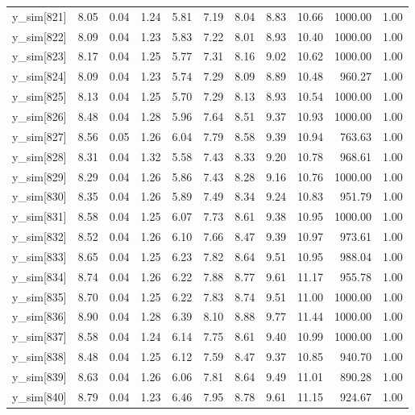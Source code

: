 \begin{table}[ht]
\begin{tabular}{rrrrrrrrrrr}
  y\_sim[821] & 8.05 & 0.04 & 1.24 & 5.81 & 7.19 & 8.04 & 8.83 & 10.66 & 1000.00 & 1.00 \\ 
  y\_sim[822] & 8.09 & 0.04 & 1.23 & 5.83 & 7.22 & 8.01 & 8.93 & 10.40 & 1000.00 & 1.00 \\ 
  y\_sim[823] & 8.17 & 0.04 & 1.25 & 5.77 & 7.31 & 8.16 & 9.02 & 10.62 & 1000.00 & 1.00 \\ 
  y\_sim[824] & 8.09 & 0.04 & 1.23 & 5.74 & 7.29 & 8.09 & 8.89 & 10.48 & 960.27 & 1.00 \\ 
  y\_sim[825] & 8.13 & 0.04 & 1.25 & 5.70 & 7.29 & 8.13 & 8.93 & 10.54 & 1000.00 & 1.00 \\ 
  y\_sim[826] & 8.48 & 0.04 & 1.28 & 5.96 & 7.64 & 8.51 & 9.37 & 10.93 & 1000.00 & 1.00 \\ 
  y\_sim[827] & 8.56 & 0.05 & 1.26 & 6.04 & 7.79 & 8.58 & 9.39 & 10.94 & 763.63 & 1.00 \\ 
  y\_sim[828] & 8.31 & 0.04 & 1.32 & 5.58 & 7.43 & 8.33 & 9.20 & 10.78 & 968.61 & 1.00 \\ 
  y\_sim[829] & 8.29 & 0.04 & 1.26 & 5.86 & 7.43 & 8.28 & 9.16 & 10.76 & 1000.00 & 1.00 \\ 
  y\_sim[830] & 8.35 & 0.04 & 1.26 & 5.89 & 7.49 & 8.34 & 9.24 & 10.83 & 951.79 & 1.00 \\ 
  y\_sim[831] & 8.58 & 0.04 & 1.25 & 6.07 & 7.73 & 8.61 & 9.38 & 10.95 & 1000.00 & 1.00 \\ 
  y\_sim[832] & 8.52 & 0.04 & 1.26 & 6.10 & 7.66 & 8.47 & 9.39 & 10.97 & 973.61 & 1.00 \\ 
  y\_sim[833] & 8.65 & 0.04 & 1.25 & 6.23 & 7.82 & 8.64 & 9.51 & 10.95 & 988.04 & 1.00 \\ 
  y\_sim[834] & 8.74 & 0.04 & 1.26 & 6.22 & 7.88 & 8.77 & 9.61 & 11.17 & 955.78 & 1.00 \\ 
  y\_sim[835] & 8.70 & 0.04 & 1.25 & 6.22 & 7.83 & 8.74 & 9.51 & 11.00 & 1000.00 & 1.00 \\ 
  y\_sim[836] & 8.90 & 0.04 & 1.28 & 6.39 & 8.10 & 8.88 & 9.77 & 11.44 & 1000.00 & 1.00 \\ 
  y\_sim[837] & 8.58 & 0.04 & 1.24 & 6.14 & 7.75 & 8.61 & 9.40 & 10.99 & 1000.00 & 1.00 \\ 
  y\_sim[838] & 8.48 & 0.04 & 1.25 & 6.12 & 7.59 & 8.47 & 9.37 & 10.85 & 940.70 & 1.00 \\ 
  y\_sim[839] & 8.63 & 0.04 & 1.26 & 6.06 & 7.81 & 8.64 & 9.49 & 11.01 & 890.28 & 1.00 \\ 
  y\_sim[840] & 8.79 & 0.04 & 1.23 & 6.46 & 7.95 & 8.78 & 9.61 & 11.15 & 924.67 & 1.00 \\ 

\end{tabular}
\end{table}
